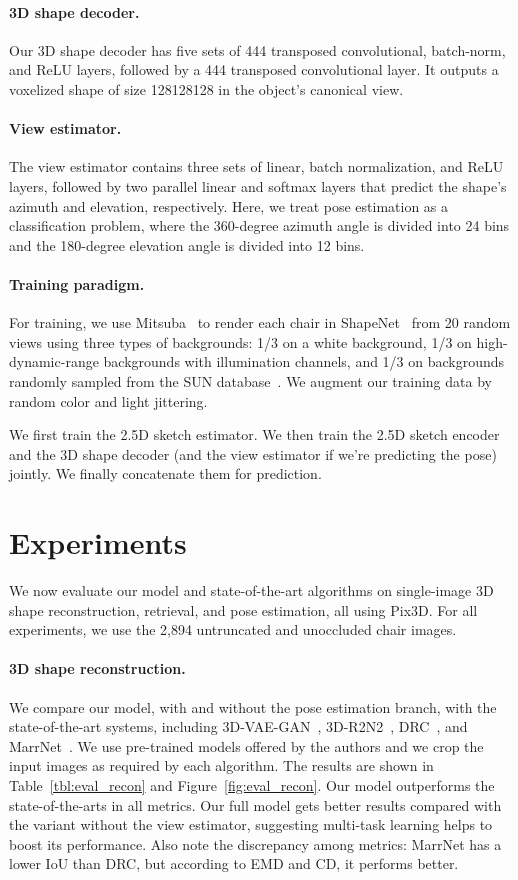 \documentclass[10pt,twocolumn,letterpaper]{article}
\newcommand{\fig}[1]{Figure~\ref{#1}}
\newcommand{\tbl}[1]{Table~\ref{#1}}
\newcommand{\myparagraph}[1]{\vspace{-14pt}\paragraph{#1}}
\newcommand{\data}{Pix3D\xspace}
\begin{document}
\myparagraph{3D shape decoder.}
Our 3D shape decoder has five sets of 444 transposed convolutional, batch-norm, and ReLU layers, followed by a 444 transposed convolutional layer. It outputs a voxelized shape of size 128128128 in the object's canonical view. 

\myparagraph{View estimator.}
The view estimator contains three sets of linear, batch normalization, and ReLU layers, followed by two parallel linear and softmax layers that predict the shape's azimuth and elevation, respectively. Here, we treat pose estimation as a classification problem, where the 360-degree azimuth angle is divided into 24 bins and the 180-degree elevation angle is divided into 12 bins.

\myparagraph{Training paradigm.}

For training, we use Mitsuba~\cite{Mitsuba} to render each chair in ShapeNet~\cite{Chang2015Shapenet:} from 20 random views using three types of backgrounds: 1/3 on a white background, 1/3 on high-dynamic-range backgrounds with illumination channels, and 1/3 on backgrounds randomly sampled from the SUN database~\cite{Xiao2010Sun}. We augment our training data by random color and light jittering. 

We first train the 2.5D sketch estimator. We then train the 2.5D sketch encoder and the 3D shape decoder (and the view estimator if we're predicting the pose) jointly. We finally concatenate them for prediction.
 \section{Experiments}
\label{sec:exp}

We now evaluate our model and state-of-the-art algorithms on single-image 3D shape reconstruction, retrieval, and pose estimation, all using \data. For all experiments, we use the 2,894 untruncated and unoccluded chair images. 

\myparagraph{3D shape reconstruction.}

We compare our model, with and without the pose estimation branch, with the state-of-the-art systems, including 3D-VAE-GAN~\cite{Wu2016Learning}, 3D-R2N2~\cite{Choy20163d}, DRC~\cite{Tulsiani2017Multi}, and MarrNet~\cite{marrnet}. We use pre-trained models offered by the authors and we crop the input images as required by each algorithm. The results are shown in \tbl{tbl:eval_recon} and \fig{fig:eval_recon}. Our model outperforms the state-of-the-arts in all metrics. Our full model gets better results compared with the variant without the view estimator, suggesting multi-task learning helps to boost its performance. Also note the discrepancy among metrics: MarrNet has a lower IoU than DRC, but according to EMD and CD, it performs better.
\end{document}
